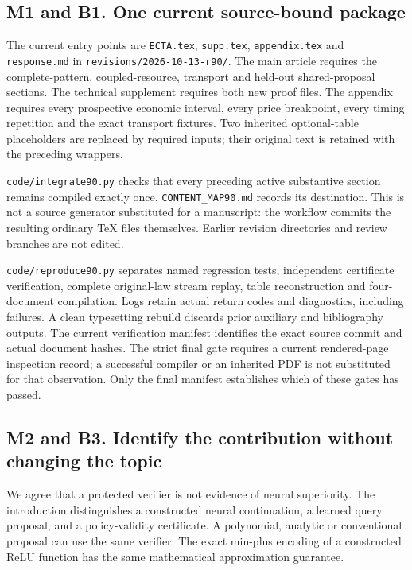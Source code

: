 \hypertarget{m1-and-b1.-one-current-source-bound-package}{%
\subsection{M1 and B1. One current source-bound
package}\label{m1-and-b1.-one-current-source-bound-package}}

The current entry points are \texttt{ECTA.tex}, \texttt{supp.tex},
\texttt{appendix.tex} and \texttt{response.md} in
\texttt{revisions/2026-10-13-r90/}. The main article requires the
complete-pattern, coupled-resource, transport and held-out
shared-proposal sections. The technical supplement requires both new
proof files. The appendix requires every prospective economic interval,
every price breakpoint, every timing repetition and the exact transport
fixtures. Two inherited optional-table placeholders are replaced by
required inputs; their original text is retained with the preceding
wrappers.

\texttt{code/integrate90.py} checks that every preceding active
substantive section remains compiled exactly once.
\texttt{CONTENT\_MAP90.md} records its destination. This is not a source
generator substituted for a manuscript: the workflow commits the
resulting ordinary TeX files themselves. Earlier revision directories
and review branches are not edited.

\texttt{code/reproduce90.py} separates named regression tests,
independent certificate verification, complete original-law stream
replay, table reconstruction and four-document compilation. Logs retain
actual return codes and diagnostics, including failures. A clean
typesetting rebuild discards prior auxiliary and bibliography outputs.
The current verification manifest identifies the exact source commit and
actual document hashes. The strict final gate requires a current
rendered-page inspection record; a successful compiler or an inherited
PDF is not substituted for that observation. Only the final manifest
establishes which of these gates has passed.

\hypertarget{m2-and-b3.-identify-the-contribution-without-changing-the-topic}{%
\subsection{M2 and B3. Identify the contribution without changing the
topic}\label{m2-and-b3.-identify-the-contribution-without-changing-the-topic}}

We agree that a protected verifier is not evidence of neural
superiority. The introduction distinguishes a constructed neural
continuation, a learned query proposal, and a policy-validity
certificate. A polynomial, analytic or conventional proposal can use the
same verifier. The exact min-plus encoding of a constructed ReLU
function has the same mathematical approximation guarantee.

